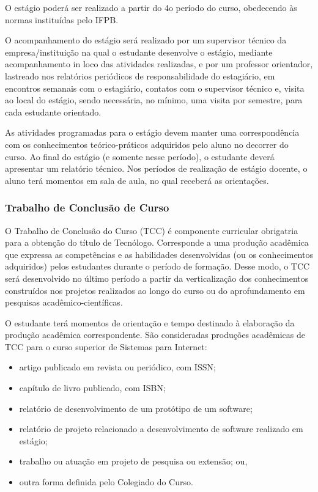 O estágio poderá ser realizado a partir do 4o período do curso, obedecendo às normas instituídas pelo IFPB.

O acompanhamento do estágio será realizado por um supervisor técnico da empresa/instituição na qual o estudante desenvolve o estágio, mediante acompanhamento in loco das atividades realizadas, e por um professor orientador, lastreado nos relatórios periódicos de responsabilidade do estagiário, em encontros semanais com o estagiário, contatos com o supervisor técnico e, visita ao local do estágio, sendo necessária, no mínimo, uma visita por semestre, para cada estudante orientado.

As atividades programadas para o estágio devem manter uma correspondência com os conhecimentos teórico-práticos adquiridos pelo aluno no decorrer do curso. Ao final do estágio (e somente nesse período), o estudante deverá apresentar um relatório técnico. Nos períodos de realização de estágio docente, o aluno terá momentos em sala de aula, no qual receberá as orientações.

\subsubsection{Trabalho de Conclusão de Curso}


O Trabalho de Conclusão do Curso (TCC) é componente curricular obrigatria para a obtenção do título de Tecnólogo. Corresponde a uma produção acadêmica que expressa as competências e as habilidades desenvolvidas (ou os conhecimentos adquiridos) pelos estudantes durante o período de formação. Desse modo, o TCC será desenvolvido no último período a partir da verticalização dos conhecimentos construídos nos projetos realizados ao longo do curso ou do aprofundamento em pesquisas acadêmico-científicas.

O estudante terá momentos de orientação e tempo destinado à elaboração da produção acadêmica correspondente. São consideradas produções acadêmicas de TCC para o curso superior de Sistemas para Internet:

\begin{itemize}
	\item artigo publicado em revista ou periódico, com ISSN;
	\item capítulo de livro publicado, com ISBN;
	\item relatório de desenvolvimento de um protótipo de um software;
	\item relatório de projeto relacionado a desenvolvimento de software realizado em estágio;
	\item trabalho ou atuação em projeto de pesquisa ou extensão; ou,
	\item outra forma definida pelo Colegiado do Curso.
\end{itemize}
	

